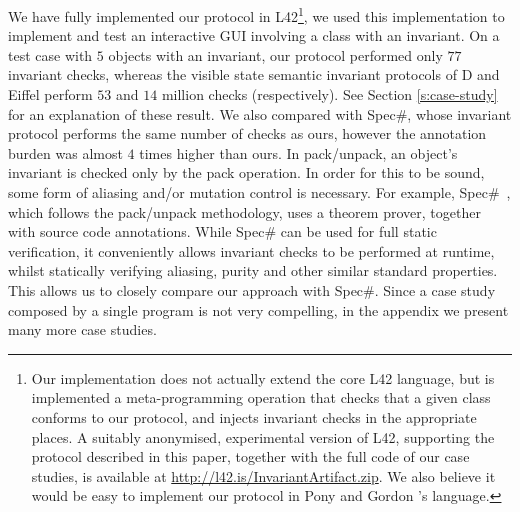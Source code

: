 We have fully implemented our protocol in L42\footnote{
Our implementation does not actually extend the core L42 language, but is implemented a meta-programming operation that
checks that a given class conforms to our protocol, and injects invariant checks in the appropriate places.
A suitably anonymised, experimental version of L42, supporting the protocol described in this paper, together with the full code of our case studies, is available at \url{http://l42.is/InvariantArtifact.zip}. We also believe it would be easy to implement our protocol in Pony and Gordon \etal's language.}, we used this implementation to implement and test an interactive GUI involving a class with an invariant. On a test case with $5$ objects with an invariant, 
our protocol performed only $77$ invariant checks, whereas the visible state semantic invariant protocols of D and Eiffel perform $53$ and $14$ million checks (respectively). See Section \ref{s:case-study} for an explanation of these result.
We also compared with Spec\#, whose invariant protocol performs the same number of checks as ours, however the annotation burden was almost $4$ times higher than ours.
In pack/unpack, an object's invariant is checked only by the pack operation.
In order for this to be sound, some form of aliasing and/or mutation control is necessary. For example, Spec\#~\cite{Barnett:2004:SPS:2131546.2131549}, which follows the pack/unpack methodology, uses a theorem prover, together with source code annotations.
While Spec\# can be used for full static verification, it conveniently allows invariant checks to be performed
at runtime, whilst statically verifying aliasing, purity and other similar standard properties.
This allows us to closely compare our approach with Spec\#.
Since a case study composed by a single program is not very compelling, in the appendix we present many more case studies.


